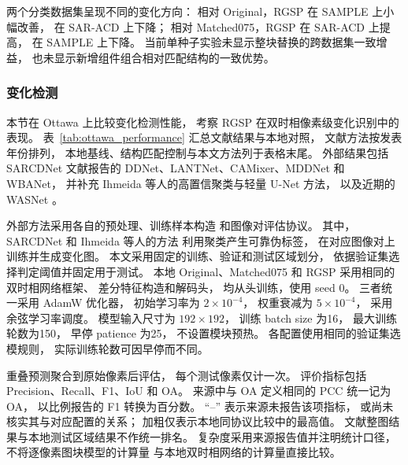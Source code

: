 两个分类数据集呈现不同的变化方向：
相对 Original，RGSP 在 SAMPLE 上小幅改善，
在 SAR-ACD 上下降；
相对 Matched075，RGSP 在 SAR-ACD 上提高，
在 SAMPLE 上下降。
当前单种子实验未显示整块替换的跨数据集一致增益，
也未显示新增组件组合相对匹配结构的一致优势。
\subsubsection{变化检测}
\label{sec:change_detection_results}

本节在 Ottawa 上比较变化检测性能，
考察 RGSP 在双时相像素级变化识别中的表现。
表~\ref{tab:ottawa_performance}
汇总文献结果与本地对照，
文献方法按发表年份排列，
本地基线、结构匹配控制与本文方法列于表格末尾。
外部结果包括 SARCDNet 文献报告的
DDNet、LANTNet、CAMixer、MDDNet 和 WBANet，
并补充 Ihmeida 等人的高置信聚类与轻量 U-Net 方法，
以及近期的 WASNet
\cite{sarcdnet2026,ihmeida2025,wasnet2026}。

外部方法采用各自的预处理、训练样本构造
和图像对评估协议。
其中，SARCDNet 和 Ihmeida 等人的方法
利用聚类产生可靠伪标签，
在对应图像对上训练并生成变化图。
本文采用固定的训练、验证和测试区域划分，
依据验证集选择判定阈值并固定用于测试。
本地 Original、Matched075 和 RGSP
采用相同的双时相网络框架、
差分特征构造和解码头，
均从头训练，使用 seed 0。
三者统一采用 AdamW 优化器，
初始学习率为 $2\times10^{-4}$，
权重衰减为 $5\times10^{-4}$，
采用余弦学习率调度。
模型输入尺寸为 $192\times192$，
训练 batch size 为16，
最大训练轮数为150，
早停 patience 为25，
不设置模块预热。
各配置使用相同的验证集选模规则，
实际训练轮数可因早停而不同。

重叠预测聚合到原始像素后评估，
每个测试像素仅计一次。
评价指标包括 Precision、Recall、F1、IoU 和 OA。
来源中与 OA 定义相同的 PCC 统一记为 OA，
以比例报告的 F1 转换为百分数。
``--'' 表示来源未报告该项指标，
或尚未核实其与对应配置的关系；
加粗仅表示本地同协议比较中的最高值。
文献整图结果与本地测试区域结果不作统一排名。
复杂度采用来源报告值并注明统计口径，
不将逐像素图块模型的计算量
与本地双时相网络的计算量直接比较。

